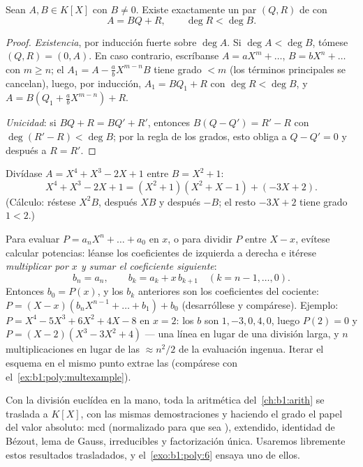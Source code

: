 \begin{theorem}\label{thm:b1:poly:division}
Sean $A, B \in K[X]$ con $B \neq 0$. Existe exactamente un par
$(Q, R)$ de  con
\[
A = BQ + R, \qquad \deg R < \deg B .
\]
\end{theorem}

\begin{proof}
\emph{Existencia}, por inducción fuerte sobre $\deg A$. Si
$\deg A < \deg B$, tómese $(Q, R) = (0, A)$. En caso contrario,
escríbanse $A = a X^m + \dots$, $B = b X^n + \dots$ con $m \geq n$; el
 $A_1 = A - \frac ab X^{m-n} B$ tiene grado $< m$ (los
términos principales se cancelan), luego, por inducción,
$A_1 = BQ_1 + R$ con $\deg R < \deg B$, y
$A = B(Q_1 + \frac ab X^{m-n}) + R$.

\emph{Unicidad}: si $BQ + R = BQ' + R'$, entonces $B(Q - Q') = R' - R$
con $\deg(R' - R) < \deg B$; por la regla de los grados, esto obliga a
$Q - Q' = 0$ y después a $R = R'$.
\end{proof}

\begin{example}\label{ex:b1:poly:division}
Divídase $A = X^4 + X^3 - 2X + 1$ entre $B = X^2 + 1$:
\[
X^4 + X^3 - 2X + 1 = (X^2 + 1)(X^2 + X - 1) + (-3X + 2).
\]
(Cálculo: réstese $X^2 B$, después $X B$ y después $-B$; el resto
$-3X + 2$ tiene grado $1 < 2$.)
\end{example}

\begin{method}\label{met:b1:poly:horner}
Para evaluar $P = a_nX^n + \dots + a_0$ en $x$, o para dividir $P$
entre $X - x$, evítese calcular potencias: léanse los coeficientes de
izquierda a derecha e itérese \emph{multiplicar por $x$ y sumar el
coeficiente siguiente}:
\[
b_n = a_n, \qquad b_{k} = a_{k} + x\,b_{k+1}
\quad (k = n-1, \dots, 0) .
\]
Entonces $b_0 = P(x)$, y los $b_k$ anteriores son los coeficientes del
cociente: $P = (X - x)(b_nX^{n-1} + \dots + b_1) + b_0$ (desarróllese y
compárese). Ejemplo: $P = X^4 - 5X^3 + 6X^2 + 4X - 8$ en $x = 2$: los
$b$ son $1, -3, 0, 4, 0$, luego $P(2) = 0$ y
$P = (X-2)(X^3 - 3X^2 + 4)$ --- una línea en lugar de una división
larga, y $n$ multiplicaciones en lugar de las $\approx n^2/2$ de la
evaluación ingenua. Iterar el esquema en el mismo punto extrae las
 (compárese con el~\cref{ex:b1:poly:multexample}).
\end{method}

\begin{remark}[{Aritmética de $K[X]$}]
Con la división euclídea en la mano, toda la aritmética
del~\cref{ch:b1:arith} se traslada a $K[X]$, con las mismas
demostraciones y haciendo el grado el papel del valor absoluto: mcd
(normalizado para que sea ),  extendido,
identidad de Bézout, lema de Gauss,  irreducibles y
factorización única. Usaremos libremente estos resultados
trasladados, y el~\cref{exo:b1:poly:6} ensaya uno de ellos.
\end{remark}

